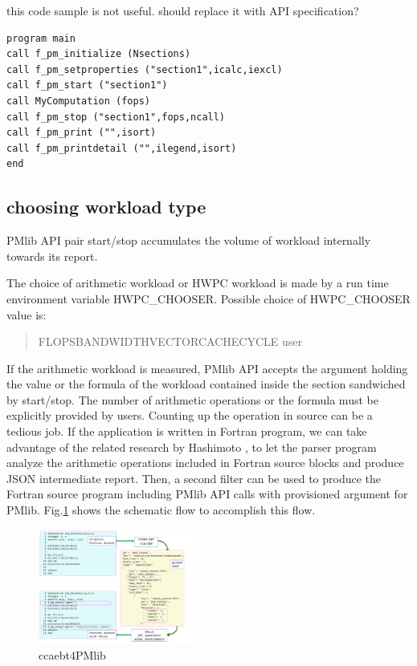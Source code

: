 \documentclass[conference]{IEEEtran}
\begin{document}
{\color{blue} this code sample is not useful. should replace it
with API specification?}
\begin{lstlisting}
program main
call f_pm_initialize (Nsections)
call f_pm_setproperties ("section1",icalc,iexcl)
call f_pm_start ("section1")
call MyComputation (fops)
call f_pm_stop ("section1",fops,ncall)
call f_pm_print ("",isort)
call f_pm_printdetail ("",ilegend,isort)
end
\end{lstlisting}


\subsection {choosing workload type}
PMlib API pair start/stop accumulates the volume of workload internally
towards its report.

The choice of arithmetic workload or HWPC workload is made by a
run time environment variable HWPC\_CHOOSER.
Possible choice of HWPC\_CHOOSER value is:
\begin{quote}
\begin{small}
FLOPS\textbar BANDWIDTH\textbar VECTOR\textbar CACHE\textbar CYCLE%
\textbar user
\end{small}
\end{quote}

If the arithmetic workload is measured,
PMlib API accepts the argument holding the value or the formula
of the workload contained inside the section sandwiched by start/stop.
The number of arithmetic operations or the formula must be explicitly
provided by users. Counting up the operation in source can be a tedious job.
If the application is written in Fortran program,
we can take advantage of the related research by Hashimoto
\cite{Hoshimoto:2015}, \cite{ccaebt:HPCAsia2018}
to let the parser program analyze the arithmetic operations
included in Fortran source blocks and produce JSON intermediate report.
Then, a second filter can be used to produce the
Fortran source program including PMlib API calls with
provisioned argument for PMlib.
Fig.\ref{fig:ccaebt4PMlib} shows the schematic flow to accomplish this flow.
\begin{figure}[tb]
\centering
\includegraphics[width=0.45\textwidth]{figs/ccaebt4PMlib.pdf}
\caption{ccaebt4PMlib}
\label{fig:ccaebt4PMlib}
\end{figure}
\end{document}
